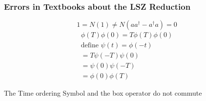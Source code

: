 \documentclass[]{scrartcl}
\begin{document}
\subsubsection{Errors in Textbooks about the LSZ Reduction}
\begin{equation}
	1 = N(1) \neq N(aa^\dagger - a^\dagger a) = 0
\end{equation}
\begin{gather}
	\phi(T)\phi(0) = T\phi(T)\phi(0)\\
	\text{define $\psi(t) = \phi(-t)$}\nonumber\\
	= T\psi(-T)\psi(0)\\
	= \psi(0)\psi(-T)\\
	= \phi(0)\phi(T)
\end{gather}

The Time ordering Symbol and the box operator do not commute




\end{document}
